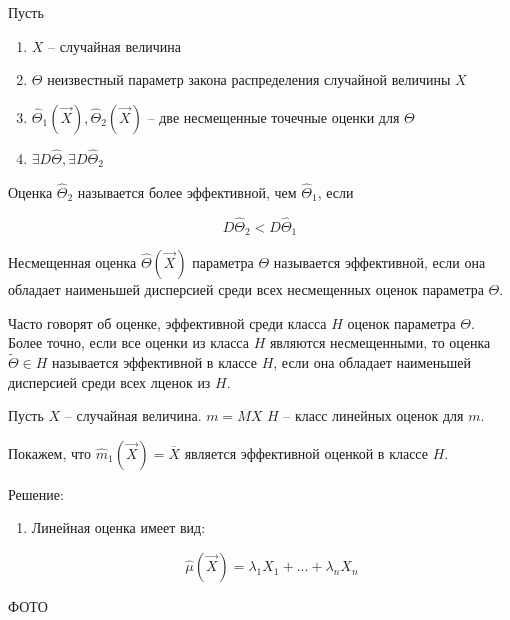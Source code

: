\begin{defenition}
    Пусть

    \begin{enumerate}
        \item $X$ -- случайная величина
        \item $\Theta$ неизвестный параметр закона распределения
            случайной величины $X$
        \item $\hat \Theta_1 (\vec X), \hat \Theta_2 (\vec X)$ --
            две несмещенные точечные оценки для $\Theta$
        \item $\exists D \hat \Theta, \exists D \hat \Theta_2$
    \end{enumerate}

    Оценка $\hat \Theta_2$ называется более эффективной, чем
    $\hat \Theta_1$, если

    \begin{equation*}
        D \hat \Theta_2 < D \hat \Theta_1
    \end{equation*}
\end{defenition}

\begin{defenition}
    Несмещенная оценка $\hat \Theta (\vec X)$ параметра $\Theta$ называется
    эффективной, если она обладает наименьшей дисперсией среди всех
    несмещенных оценок параметра $\Theta$.
\end{defenition}

\begin{note}
    Часто говорят об оценке, эффективной среди класса $H$ оценок
    параметра $\Theta$. Более точно, если все оценки из класса $H$
    являются несмещенными, то оценка $\tilde \Theta \in H$ называется
    эффективной в классе $H$, если она обладает наименьшей дисперсией среди
    всех лценок из $H$.
\end{note}

\begin{example}
    Пусть $X$ -- случайная величина. $m = MX$
    $H$ -- класс линейных оценок для $m$.

    Покажем, что $\hat m_1 (\vec X) = \overline{X}$ является
    эффективной оценкой в классе $H$.

    Решение:

    \begin{enumerate}
        \item Линейная оценка имеет вид:

            \begin{equation*}
                \hat \mu (\vec X) = \lambda_1 X_1 + ... + \lambda_n X_n
            \end{equation*}
    \end{enumerate}

    ФОТО
\end{example}

